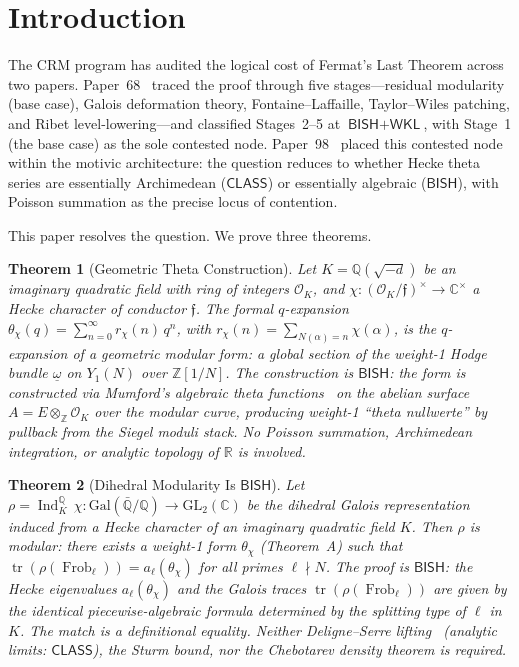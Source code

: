 \documentclass[11pt,a4paper]{article}
\theoremstyle{plain}
\newtheorem{theorem}{Theorem}[section]
\theoremstyle{definition}
\newcommand{\BISH}{\textsf{BISH}}
\newcommand{\WKL}{\textsf{WKL}}
\newcommand{\CLASS}{\textsf{CLASS}}
\newcommand{\Z}{\mathbb{Z}}
\newcommand{\Q}{\mathbb{Q}}
\newcommand{\R}{\mathbb{R}}
\newcommand{\C}{\mathbb{C}}
\newcommand{\Gal}{\mathrm{Gal}}
\newcommand{\GL}{\mathrm{GL}}
\DeclareMathOperator{\tr}{tr}
\DeclareMathOperator{\Ind}{Ind}
\DeclareMathOperator{\Frob}{Frob}
\begin{document}
\section{Introduction}\label{sec:intro}

The CRM program has audited the logical cost of Fermat's Last Theorem across two papers. Paper~68~\cite{lee-p68} traced the proof through five stages---residual modularity (base case), Galois deformation theory, Fontaine--Laffaille, Taylor--Wiles patching, and Ribet level-lowering---and classified Stages~2--5 at $\BISH + \WKL$, with Stage~1 (the base case) as the sole contested node. Paper~98~\cite{lee-p98} placed this contested node within the motivic architecture: the question reduces to whether Hecke theta series are essentially Archimedean ($\CLASS$) or essentially algebraic ($\BISH$), with Poisson summation as the precise locus of contention.

This paper resolves the question. We prove three theorems.

\begin{theorem}[Geometric Theta Construction]\label{thm:A}
Let $K = \Q(\sqrt{-d})$ be an imaginary quadratic field with ring of integers $\mathcal{O}_K$, and $\chi : (\mathcal{O}_K/\mathfrak{f})^\times \to \C^\times$ a Hecke character of conductor $\mathfrak{f}$.
The formal $q$-expansion $\theta_\chi(q) = \sum_{n=0}^\infty r_\chi(n)\, q^n$, with $r_\chi(n) = \sum_{N(\alpha)=n} \chi(\alpha)$, is the $q$-expansion of a geometric modular form: a global section of the weight-1 Hodge bundle $\underline{\omega}$ on $Y_1(N)$ over $\Z[1/N]$.
The construction is $\BISH$: the form is constructed via Mumford's algebraic theta functions~\cite{mumford66} on the abelian surface $A = E \otimes_\Z \mathcal{O}_K$ over the modular curve, producing weight-1 ``theta nullwerte'' by pullback from the Siegel moduli stack.
No Poisson summation, Archimedean integration, or analytic topology of $\R$ is involved.
\end{theorem}

\begin{theorem}[Dihedral Modularity Is $\BISH$]\label{thm:B}
Let $\rho = \Ind_K^\Q\, \chi : \Gal(\bar{\Q}/\Q) \to \GL_2(\C)$ be the dihedral Galois representation induced from a Hecke character of an imaginary quadratic field $K$.
Then $\rho$ is modular: there exists a weight-1 form $\theta_\chi$ (Theorem~A) such that $\tr(\rho(\Frob_\ell)) = a_\ell(\theta_\chi)$ for all primes $\ell \nmid N$.
The proof is $\BISH$: the Hecke eigenvalues $a_\ell(\theta_\chi)$ and the Galois traces $\tr(\rho(\Frob_\ell))$ are given by the identical piecewise-algebraic formula determined by the splitting type of $\ell$ in $K$.
The match is a definitional equality.
Neither Deligne--Serre lifting~\cite{deligne-serre74} (analytic limits: $\CLASS$), the Sturm bound, nor the Chebotarev density theorem is required.
\end{theorem}
\end{document}
